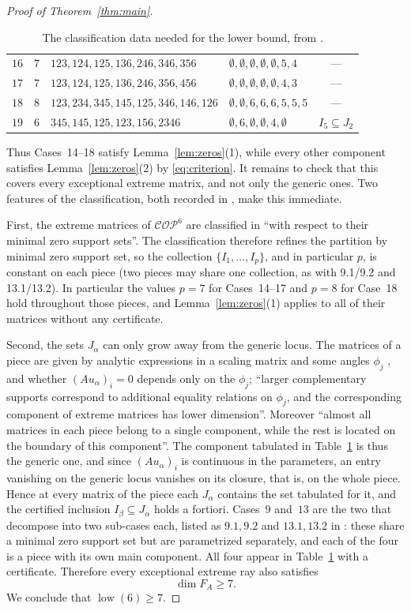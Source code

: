 \documentclass[11pt]{amsart}
\theoremstyle{remark}
\newcommand{\COP}{\mathcal{COP}}
\newcommand{\low}{\operatorname{low}}
\begin{document}
\begin{proof}[Proof of Theorem~\ref{thm:main}]
\begin{table}[ht]
\begin{tabular}{@{}ccllc@{}}
$16$ & $7$ & $123,124,125,136,246,346,356$ & $\emptyset,\emptyset,\emptyset,\emptyset,\emptyset,5,4$ & --- \\
$17$ & $7$ & $123,124,125,136,246,356,456$ & $\emptyset,\emptyset,\emptyset,\emptyset,\emptyset,4,3$ & --- \\
$18$ & $8$ & $123,234,345,145,125,346,146,126$ & $\emptyset,\emptyset,6,6,6,5,5,5$ & --- \\
$19$ & $6$ & $345,145,125,123,156,2346$ & $\emptyset,6,\emptyset,\emptyset,4,\emptyset$ & $I_{5}\subseteq J_{2}$ \\
\bottomrule
\end{tabular}
\caption{The classification data needed for the lower bound, from
\cite[Table~1]{HA}.}
\label{tab:audit}
\end{table}

Thus Cases~14--18 satisfy Lemma~\ref{lem:zeros}(1), while every other
component satisfies Lemma~\ref{lem:zeros}(2) by \eqref{eq:criterion}. It
remains to check that this covers every exceptional extreme matrix, and not
only the generic ones. Two features of the classification, both recorded in
\cite[Section~2]{HA}, make this immediate.

First, the extreme matrices of $\COP^6$ are classified in \cite{AHD} ``with
respect to their minimal zero support sets''. The classification therefore
refines the partition by minimal zero support set, so the collection
$\{I_1,\dots,I_p\}$, and in particular $p$, is constant on each piece (two
pieces may share one collection, as with 9.1/9.2 and 13.1/13.2). In particular the
values $p=7$ for Cases~14--17 and $p=8$ for Case~18 hold throughout those
pieces, and Lemma~\ref{lem:zeros}(1) applies to all of their matrices without
any certificate.

Second, the sets $J_\alpha$ can only grow away from the generic locus. The
matrices of a piece are given by analytic expressions in a scaling matrix and
some angles $\phi_j$ \cite[Section~5]{AHD}, and whether $(Au_\alpha)_i=0$
depends only on the $\phi_j$; ``larger complementary supports correspond to
additional equality relations on $\phi_j$, and the corresponding component of
extreme matrices has lower dimension''. Moreover ``almost all matrices in
each piece belong to a single component, while the rest is located on the
boundary of this component''. The component tabulated in
Table~\ref{tab:audit} is thus the generic one, and since $(Au_\alpha)_i$ is
continuous in the parameters, an entry vanishing on the generic locus vanishes
on its closure, that is, on the whole piece. Hence at every matrix of the
piece each $J_\alpha$ contains the set tabulated for it, and the certified
inclusion $I_\beta\subseteq J_\alpha$ holds a fortiori. Cases~$9$ and~$13$ are
the two that decompose into two sub-cases each, listed as $9.1,9.2$ and
$13.1,13.2$ in \cite[Section~3.4]{AHD}: these share a minimal zero support
set but are parametrized separately, and each of the four is a piece with its
own main component. All four appear in Table~\ref{tab:audit} with a
certificate. Therefore
every exceptional extreme ray also satisfies
\[
\dim F_A\ge7.
\]
We conclude that $\low(6)\ge7$.


\end{proof}
\end{document}
